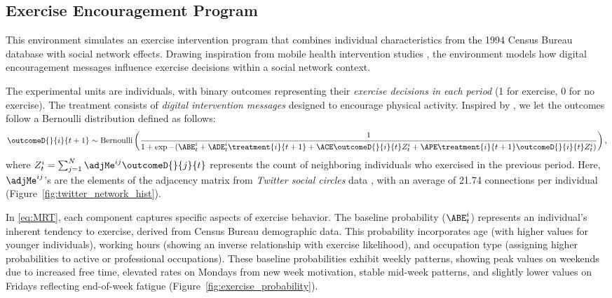 \subsection{Exercise Encouragement Program}
\label{sec:BOM}
% 
This environment simulates an exercise intervention program that combines individual characteristics from the 1994 Census Bureau database \citep{kohavi1994data} with social network effects. Drawing inspiration from mobile health intervention studies \citep{liao2016sample,klasnja2015microrandomized,klasnja2019efficacy}, the environment models how digital encouragement messages influence exercise decisions within a social network context.

The experimental units are individuals, with binary outcomes representing their \emph{exercise decisions in each period} (1 for exercise, 0 for no exercise). The treatment consists of \emph{digital intervention messages} designed to encourage physical activity. Inspired by \cite{li2022network}, we let the outcomes follow a Bernoulli distribution defined as follows:
% 
\begin{align}
    \label{eq:MRT}
    \outcomeD{}{i}{t+1} \sim \text{Bernoulli}\left(
    \frac{1}
    {
    1
    +
    \exp{-(
    \ABE_t^i
    +
    \ADE_t^i
    \treatment{i}{t+1}
    +
    \ACE
    \outcomeD{}{i}{t} Z^i_t
    +
    \APE \treatment{i}{t+1} \outcomeD{}{i}{t} Z^i_t
    )}}\right),
\end{align}
% 
where $Z^i_t = \sum_{j=1}^N \adjMe^{ij}\outcomeD{}{j}{t}$ represents the count of neighboring individuals who exercised in the previous period. Here, $\adjMe^{ij}$'s are the elements of the adjacency matrix from \emph{Twitter social circles} data \citep{leskovec2012learning}, with an average of 21.74 connections per individual (Figure~\ref{fig:twitter_network_hist}). 

In \eqref{eq:MRT}, each component captures specific aspects of exercise behavior. The baseline probability ($\ABE_t^i$) represents an individual's inherent tendency to exercise, derived from Census Bureau demographic data. This probability incorporates age (with higher values for younger individuals), working hours (showing an inverse relationship with exercise likelihood), and occupation type (assigning higher probabilities to active or professional occupations). These baseline probabilities exhibit weekly patterns, showing peak values on weekends due to increased free time, elevated rates on Mondays from new week motivation, stable mid-week patterns, and slightly lower values on Fridays reflecting end-of-week fatigue (Figure~\ref{fig:exercise_probability}).

